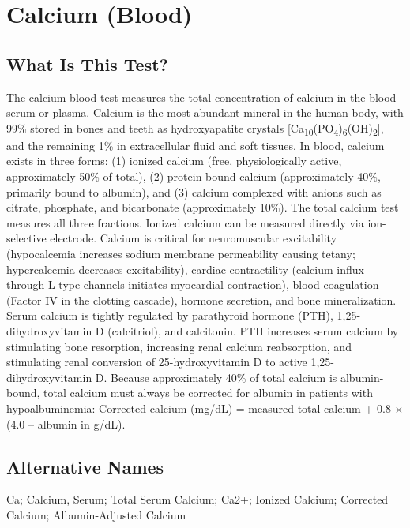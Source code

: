 \chapter{Calcium (Blood)}

\section*{What Is This Test?}
The calcium blood test measures the total concentration of calcium in the blood serum or plasma. Calcium is the most abundant mineral in the human body, with 99\% stored in bones and teeth as hydroxyapatite crystals [Ca\textsubscript{10}(PO\textsubscript{4})\textsubscript{6}(OH)\textsubscript{2}], and the remaining 1\% in extracellular fluid and soft tissues. In blood, calcium exists in three forms: (1) ionized calcium (free, physiologically active, approximately 50\% of total), (2) protein-bound calcium (approximately 40\%, primarily bound to albumin), and (3) calcium complexed with anions such as citrate, phosphate, and bicarbonate (approximately 10\%). The total calcium test measures all three fractions. Ionized calcium can be measured directly via ion-selective electrode. Calcium is critical for neuromuscular excitability (hypocalcemia increases sodium membrane permeability causing tetany; hypercalcemia decreases excitability), cardiac contractility (calcium influx through L-type channels initiates myocardial contraction), blood coagulation (Factor IV in the clotting cascade), hormone secretion, and bone mineralization. Serum calcium is tightly regulated by parathyroid hormone (PTH), 1,25-dihydroxyvitamin D (calcitriol), and calcitonin. PTH increases serum calcium by stimulating bone resorption, increasing renal calcium reabsorption, and stimulating renal conversion of 25-hydroxyvitamin D to active 1,25-dihydroxyvitamin D. Because approximately 40\% of total calcium is albumin-bound, total calcium must always be corrected for albumin in patients with hypoalbuminemia: Corrected calcium (mg/dL) = measured total calcium + 0.8 $\times$ (4.0 -- albumin in g/dL).

\section*{Alternative Names}
Ca; Calcium, Serum; Total Serum Calcium; Ca2+; Ionized Calcium; Corrected Calcium; Albumin-Adjusted Calcium

